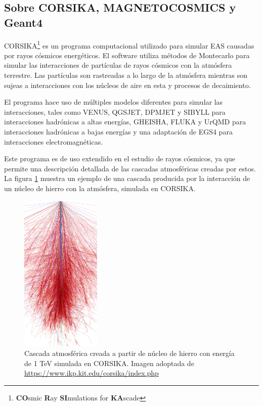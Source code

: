 \documentclass[12pt]{report}
\begin{document}
\subsection*{Sobre CORSIKA, MAGNETOCOSMICS y Geant4}

CORSIKA\footnote{\textbf{CO}smic \textbf{R}ay \textbf{SI}mulations for \textbf{KA}scade} es un programa computacional utilizado para simular EAS causadas por rayos cósmicos energéticos. El software utiliza métodos de Montecarlo para simular las interacciones de partículas de rayos cósmicos con la atmósfera terrestre. Las partículas son rastreadas a lo largo de la atmósfera mientras son sujeas a interacciones con los núcleos de aire en esta y procesos de decaimiento.

El programa hace uso de múltiples modelos diferentes para simular las interacciones, tales como VENUS, QGSJET, DPMJET y SIBYLL para interacciones hadrónicas a altas energías, GHEISHA, FLUKA y UrQMD para interacciones hadrónicas a bajas energías y una adaptación de EGS4 para interacciones electromagnéticas. \cite{corsika}

Este programa es de uso extendido en el estudio de rayos cósmicos, ya que permite una descripción detallada de las cascadas atmosféricas creadas por estos. La figura \ref{fig:ironcascade} muestra un ejemplo de una cascada producida por la interacción de un núcleo de hierro con la atmósfera, simulada en CORSIKA.

\begin{figure}
    \centering
    \includegraphics[width=1.5in]{images/ironcascade.png}
    \caption{Cascada atmosférica creada a partir de núcleo de hierro con energía de 1 TeV simulada en CORSIKA. Imagen adoptada de \url{https://www.ikp.kit.edu/corsika/index.php}}
    \label{fig:ironcascade}
\end{figure}
\end{document}
